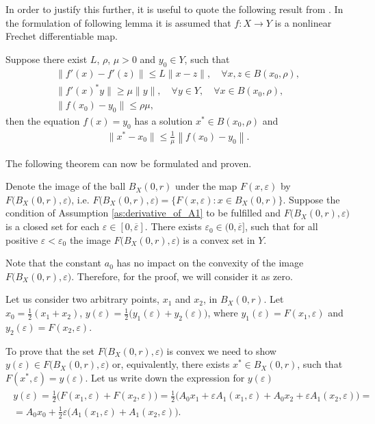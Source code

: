 \documentclass[../main.tex]{subfiles}
\begin{document}
In order to justify this further, it is useful to quote the following result from \cite{Polyak2001, Polyak1964}.  In the formulation of following lemma it is assumed that $f:X \to Y$ is a nonlinear Frechet differentiable map.
\begin{lemma}\label{lem:Polyak_lemma}
	Suppose there exist $L$, $\rho$, $\mu > 0$ and $y_0 \in Y$, such that 
	\begin{gather*}
		\| f'(x) - f'(z) \| \leqslant L \| x - z\|, \quad \forall x,z \in B(x_0,\rho), \\
		\| f'(x)^*y \| \geqslant \mu \|y \|, \quad \forall y \in Y, \quad \forall x \in B(x_0, \rho), \\
		\| f(x_0) - y_0 \| \leqslant \rho \mu,
	\end{gather*}
	then the equation $f(x) = y_0$ has a solution $x^* \in B(x_0,\rho)$ and
	\begin{gather*}
		\|x^* - x_0\| \leqslant \frac{1}{\mu} \left\| f(x_0) - y_0 \right\|.
	\end{gather*}
\end{lemma}
The following theorem can now be formulated and proven.
\begin{theorem}\label{th:ImageConvexity}
	Denote the image of the ball $B_X(0, r)$ under the map $F(x,\varepsilon)$ by $F\big(B_X(0,r),\varepsilon\big)$, i.e. $F\big(B_X(0,r),\varepsilon\big) = \big\{F(x,\varepsilon): x\in B_X(0, r)\big\}$.
	Suppose the condition of Assumption \ref{as:derivative_of_A1} to be fulfilled and $F\big(B_X(0,r),\varepsilon\big)$ is a closed set for each $\varepsilon \in [0, \overline{\varepsilon}]$. There exists $ \varepsilon_0 \in (0, \overline{\varepsilon}]$, such that for all positive $\varepsilon < \varepsilon_0$ the image $F\big(B_X(0,r),\varepsilon\big)$ is a convex set in $Y$. 
\end{theorem}
\doc
Note that the constant $a_0$ has no impact on the convexity of the image $F\big(B_X(0,r),\varepsilon\big)$. Therefore, for the proof, we will consider it as zero.

Let us consider two arbitrary points, $x_1$ and $x_2$, in $B_X(0,r)$. 
Let $x_0 = \frac{1}{2}(x_1 + x_2)$, $y(\varepsilon) = \frac{1}{2}\big(y_1(\varepsilon)  + y_2(\varepsilon)\big)$, where $y_1(\varepsilon) = F(x_1, \varepsilon)$ and $y_2(\varepsilon) = F(x_2, \varepsilon)$. 

To prove that the set $F\big(B_X(0,r),\varepsilon\big)$ is convex we need to show $y(\varepsilon) \in F\big(B_X(0,r),\varepsilon\big)$ or, equivalently, there exists $x^* \in B_X(0,r) $, such that  $F(x^*, \varepsilon) = y(\varepsilon) $.
Let us write down the expression for $y(\varepsilon)$
\begin{gather}\label{y}
	\begin{gathered}
		y(\varepsilon)=
		\frac{1}{2} \big(
		F(x_1,\varepsilon)+ 
		F(x_2,\varepsilon)
		\big) = 
		\frac{1}{2} \big(
		A_0 x_1 +
		\varepsilon A_1(x_1,\varepsilon) +
		A_0 x_2 +
		\varepsilon A_1(x_2,\varepsilon) 
		\big) = \\ = A_0 x_0 + 
		\frac{1}{2} \varepsilon \big( 
		A_1(x_1,\varepsilon)+ 
		A_1(x_2,\varepsilon)
		\big).
	\end{gathered}
\end{gather}
\end{document}

